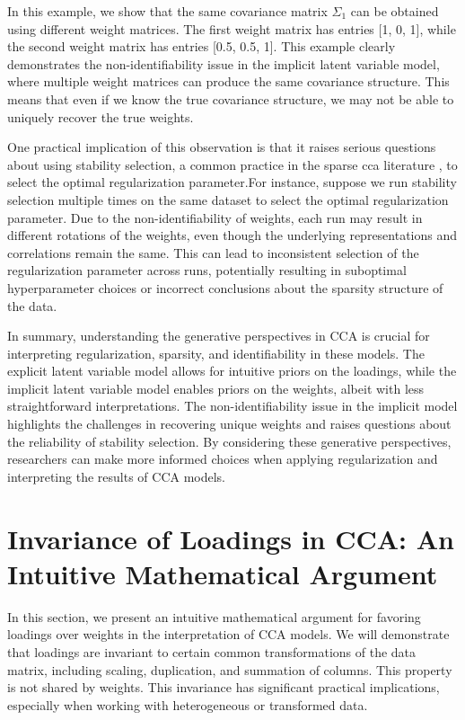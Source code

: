 In this example, we show that the same covariance matrix $\Sigma_1$ can be obtained using different weight matrices. The first weight matrix has entries [1, 0, 1], while the second weight matrix has entries [0.5, 0.5, 1]. This example clearly demonstrates the non-identifiability issue in the implicit latent variable model, where multiple weight matrices can produce the same covariance structure. This means that even if we know the true covariance structure, we may not be able to uniquely recover the true weights.

One practical implication of this observation is that it raises serious questions about using stability selection, a common practice in the sparse \acrshort{cca} literature \citep{mihalik2020multiple, deng2021sparse}, to select the optimal regularization parameter.For instance, suppose we run stability selection multiple times on the same dataset to select the optimal regularization parameter. Due to the non-identifiability of weights, each run may result in different rotations of the weights, even though the underlying representations and correlations remain the same. This can lead to inconsistent selection of the regularization parameter across runs, potentially resulting in suboptimal hyperparameter choices or incorrect conclusions about the sparsity structure of the data.

In summary, understanding the generative perspectives in CCA is crucial for interpreting regularization, sparsity, and identifiability in these models. The explicit latent variable model allows for intuitive priors on the loadings, while the implicit latent variable model enables priors on the weights, albeit with less straightforward interpretations. The non-identifiability issue in the implicit model highlights the challenges in recovering unique weights and raises questions about the reliability of stability selection. By considering these generative perspectives, researchers can make more informed choices when applying regularization and interpreting the results of CCA models.

\section{Invariance of Loadings in CCA: An Intuitive Mathematical Argument}

In this section, we present an intuitive mathematical argument for favoring loadings over weights in the interpretation of CCA models. We will demonstrate that loadings are invariant to certain common transformations of the data matrix, including scaling, duplication, and summation of columns. This property is not shared by weights. This invariance has significant practical implications, especially when working with heterogeneous or transformed data.

